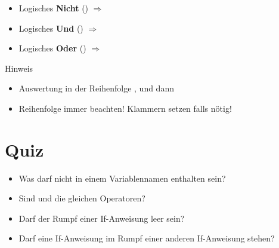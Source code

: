 \begin{frame}
    \slidehead
    \begin{itemize}
        \item Logisches \textbf{Nicht} ()  $\Rightarrow$ 
        \item Logisches \textbf{Und} () $\Rightarrow$ 
        \item Logisches \textbf{Oder} ()  $\Rightarrow$ 
    \end{itemize}
    \begin{block}{Hinweis}
        \begin{itemize}
            \item Auswertung in der Reihenfolge ,  und dann 
            \item Reihenfolge immer beachten!
                Klammern setzen falls nötig!
        \end{itemize}
    \end{block}
\end{frame}

\livecoding

\section{Quiz}
\begin{frame}[fragile]
    \slidehead
    \begin{itemize}[<+->]
        \item Was darf nicht in einem Variablennamen enthalten sein?
        \item Sind \pythoninline{=} und \pythoninline{==} die gleichen Operatoren?
        \item Darf der Rumpf einer If-Anweisung leer sein?
        \item Darf eine If-Anweisung im Rumpf einer anderen If-Anweisung stehen?
    \end{itemize}
\end{frame}




